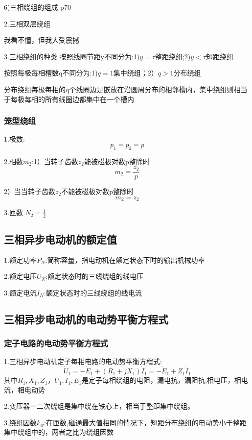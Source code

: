 \documentclass[11pt,twoside,a4paper]{ctexart}
\begin{document}
6)三相绕组的组成
p70

2.三相双层绕组

我看不懂，但我大受震撼

3.三相绕组的种类
按照线圈节距y不同分为:1)$y = \tau $整距绕组;2)$y < \tau $短距绕组

按照每极每相槽数q不同分为:1)$q = 1$集中绕组；2）$q > 1$分布绕组

分布绕组每极每相的q个线圈边是嵌放在沿圆周分布的相邻槽内，集中绕组则相当于每极每相的所有线圈边都集中在一个槽内

\subsubsection{笼型绕组}

1.极数:
\[p_1  = p_2 = p\]

2.相数$m_2$:1）当转子齿数$z_2$能被磁极对数p整除时
\[m_2 = \frac{z_2}{p}\]

2）当当转子齿数$z_2$不能被磁极对数p整除时
\[m_2 = z_2\]

3.匝数
$N_2 = \frac{1}{2}$
\subsection{三相异步电动机的额定值}

1.额定功率$P_N$:简称容量，指电动机在额定状态下时的输出机械功率

2.额定电压$U_N$:额定状态时的三线绕组的线电压

3.额定电流$I_N$:额定状态时的三线绕组的线电流

\subsection{三相异步电动机的电动势平衡方程式}

\subsubsection{定子电路的电动势平衡方程式}

1.三相异步电动机定子每相电路的电动势平衡方程式:
\[\dot{U}_1 = -\dot{E}_1 + (R_1 + jX_1)\dot{I}_1 = -\dot{E}_1 + Z_1\dot{I}_1\]
其中$R_1,X_1,Z_1，U_1,I_1,E_1 $是定子每相绕组的电阻，漏电抗，漏阻抗,相电压，相电流，相电动势

2.变压器一二次绕组是集中绕在铁心上，相当于整距集中绕组。

3.绕组因数$k_w$:在匝数,磁通最大值相同的情况下，短距分布绕组的电动势小于整距集中绕组中的，两者之比为绕组因数
\end{document}
